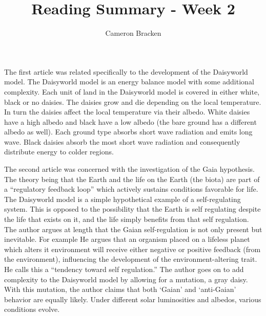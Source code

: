 \documentclass[11pt]{amsart}
\title{Reading Summary - Week 2}
\author{Cameron Bracken}
\begin{document}
\maketitle
\doublespacing

The first article was related specifically to the development of the Daisyworld model.  The Daisyworld model is an energy balance model with some additional complexity.  Each unit of land in the Daisyworld model is covered in either white, black or no daisies.   The daisies grow and die depending on the local temperature.  In turn the daisies affect the local temperature via their albedo.  White daisies have a high albedo and black have a low albedo (the bare ground has a different albedo as well).  Each ground type absorbs short wave radiation and emits long wave. Black daisies absorb the most short wave radiation and consequently distribute energy to colder regions.

The second article was concerned with the investigation of the Gaia hypothesis.  The theory being that the Earth and the life on the Earth (the biota) are part of a ``regulatory feedback loop'' which actively sustains conditions favorable for life.  The Daisyworld model is a simple hypothetical example of a self-regulating system.  This is opposed to the possibility that the Earth is self regulating despite the life that exists on it, and the life simply benefits from that self regulation.  The author argues at length that the Gaian self-regulation is not only present but inevitable.  For example He argues that an organism placed on a lifeless planet which alters it environment will receive either negative or positive feedback (from the environment), influencing the development of the environment-altering trait.  He calls this a ``tendency toward self regulation.''  The author goes on to add complexity to the Daisyworld model by allowing for a mutation, a gray daisy.  With this mutation, the author claims that both `Gaian' and `anti-Gaian' behavior are equally likely. Under different solar luminosities and albedos, various conditions evolve. 
\end{document}
